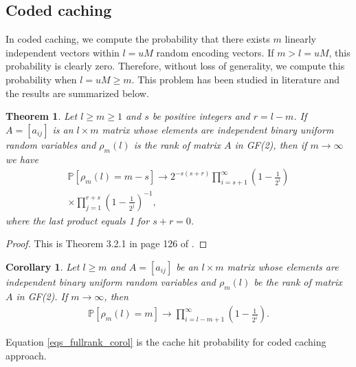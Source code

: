 \documentclass[10pt,journal]{IEEEtran}
\newtheorem{corol}{Corollary}
\newtheorem{thm}{Theorem}
\begin{document}
{\subsection{Coded caching}
In coded caching, we compute the probability that there exists $m$ linearly independent vectors within $l = u M $ random  encoding vectors.
If $m > l = u M$, this probability is clearly zero. Therefore, without loss of generality, we compute this probability when  $l = u M \ge m$. 
This problem has been studied in  literature \cite{kolchin1999random} and the results are summarized below.
\begin{thm}{\em 
Let $l \ge m \ge 1$ and $s $ be positive integers and $r = l - m$. If $A=[a_{ij}]$ is an $l \times m$ matrix whose elements are independent binary uniform random variables and $\rho_m(l)$ is the rank of matrix $A$ in GF(2), then if $m \to \infty$ we have  
\begin{align}
 \mathbb{P}[\rho_m(l) = m - s] \to 2^{-s(s+r)} \prod_{i=s+1}^{\infty}  \left(1 - \frac{1}{2^i} \right) \nonumber \\ 
 \times \prod_{j=1}^{r+s} \left(1 - \frac{1}{2^j} \right)^{-1}, 
 \label{eqs_kolchin_eqsss1}
\end{align}
where the last product equals 1 for $s+r=0$.
} \label{thm_kolchin}
\end{thm}
\begin{proof}
This is Theorem 3.2.1 in page 126 of \cite{kolchin1999random}.
\end{proof}
\begin{corol}{\em 
Let $l \ge m$ and $A=[a_{ij}]$ be an $l \times m$ matrix whose elements are independent binary uniform random variables and $\rho_m(l)$ be the rank of matrix $A$ in GF(2). If $m \to \infty$, then 
 \begin{align}
 \mathbb{P}[\rho_m(l) = m] \to  \prod_{i=l-m+1}^{\infty} \left(1 - \frac{1}{2^i} \right). 
 \label{eqs_fullrank_corol}
\end{align}
 }\label{corol_kolchin_fullrank}
\end{corol}
Equation \eqref{eqs_fullrank_corol} is the cache hit probability for coded caching approach. 

}
\end{document}
